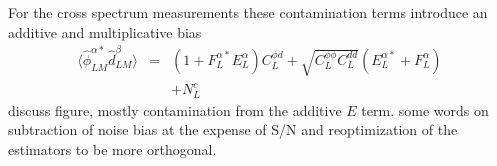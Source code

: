 \documentclass[prd,amsmath,amssymb,floatfix,superscriptaddress,nofootinbib,twocolumn]{revtex4-1}
\def\be{\begin{equation}}
\def\bea{\begin{eqnarray}}
\def\eea{\end{eqnarray}}
\newcommand{\ec}[1]{Eq.~(\ref{eq:#1})}
\newcommand{\peikai}[1]{{\color{blue} #1}}
\newcommand{\wh}[1]{{\color{red} #1}}
\begin{document}
 For the cross spectrum measurements these contamination terms introduce an additive and multiplicative bias
 \bea
 \langle \hat{\phi}^{\alpha*}_{LM}\hat{d}^{\beta}_{LM} \rangle&=& (1+ F_L^{\alpha *} E_L^{\alpha}){C}_{L}^{\phi d}+ \sqrt{C_{L}^{\phi\phi} C_{L}^{dd}} (E_L^{\alpha*} + F_L^\alpha) \nonumber\\
&&  +N_{L}^{c} 
\eea
 \wh{discuss figure, mostly contamination from the additive $E$ term.  some words on subtraction of noise bias at the expense of S/N and reoptimization of the estimators to be 
 more orthogonal.}
\end{document}
